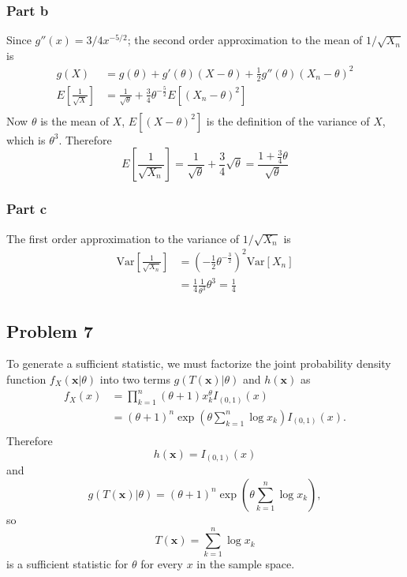 \documentclass{article}
\begin{document}
\subsubsection*{Part b}
Since $g''(x) = 3/4x^{-5/2}$; the second order approximation to the mean of $1/\sqrt{X_n}$ is 
\[\begin{aligned}
g(X) &= g(\theta)+g'(\theta)(X-\theta)+\frac{1}{2}g''(\theta)(X_n-\theta)^2 \\
E\left[\frac{1}{\sqrt{X}}\right] &= \frac{1}{\sqrt{\theta}} + \frac{3}{4}\theta^{-\frac{5}{2}}E\left[(X_n - \theta)^2\right] \\
\end{aligned}\]
Now $\theta$ is the mean of $X$, $E\left[(X - \theta)^2\right]$ is the definition of the variance of $X$, which is $\theta^3$. Therefore
\[E\left[\frac{1}{\sqrt{X_n}}\right] = \frac{1}{\sqrt{\theta}} + \frac{3}{4}\sqrt{\theta}=\frac{1+\frac{3}{4}\theta}{\sqrt{\theta}}\] 
\subsubsection*{Part c}
The first order approximation to the variance of $1/\sqrt{X_n}$ is 
\[\begin{aligned}
\text{Var}\left[\frac{1}{\sqrt{X_n}}\right] &= \left(-\frac{1}{2}\theta^{-\frac{3}{2}}\right)^2\text{Var}\left[X_n\right] \\
&= \frac{1}{4}\frac{1}{\theta^3}\theta^3 = \frac{1}{4}
\end{aligned}\]
\subsection*{Problem 7}
To generate a sufficient statistic, we must factorize the joint probability density function
$f_X(\mathbf{x}|\theta)$ into two terms $g(T(\mathbf{x})|\theta)$ and $h(\mathbf{x})$ as 
\[\begin{aligned}
f_X(x) &= \prod_{k=1}^n(\theta+1)x_k^\theta I_{(0,1)}(x) \\
&= (\theta+1)^n \exp\left(\theta\sum_{k=1}^n \log{x_k}\right) I_{(0,1)}(x).\\
\end{aligned}\]
Therefore 
\[h(\mathbf{x}) = I_{(0,1)}(x)\]
and 
\[g(T(\mathbf{x})|\theta) = (\theta+1)^n \exp\left(\theta\sum_{k=1}^n \log{x_k}\right),\]
so 
\[T(\mathbf{x}) = \sum_{k=1}^n \log{x_k}\]
is a sufficient statistic for $\theta$ for every $x$ in the sample space. 

 
\end{document}
